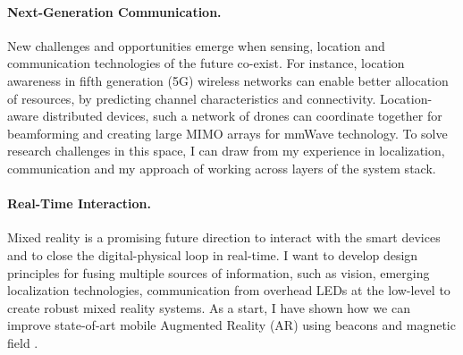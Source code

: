 \documentclass[10pt]{article}
\begin{document}

\paragraph{Next-Generation Communication. }
New challenges and opportunities emerge when sensing, location and communication technologies of the future co-exist. For instance, location awareness in fifth generation (5G) wireless networks can enable better allocation of resources, by predicting channel characteristics and connectivity. Location-aware distributed devices, such a network of drones can coordinate together for beamforming and creating large MIMO arrays for mmWave technology. To solve research challenges in this space, I can draw from my experience in localization, communication and my approach of working across layers of the system stack. \\

\paragraph{Real-Time Interaction. }
Mixed reality is a promising future direction to interact with the smart devices and to close the digital-physical loop in real-time. 
I want to develop design principles for fusing multiple sources of information, such as vision, emerging localization technologies, communication from overhead LEDs at the low-level to create robust mixed reality systems. As a start, I have shown how we can improve state-of-art mobile Augmented Reality (AR) using beacons and magnetic field \cite{mobileAR}. 

\end{document}
